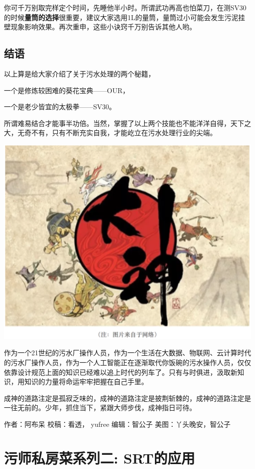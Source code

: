 \documentclass[
]{book}
\begin{document}
你可千万别取完样定个时间，先睡他半小时。所谓武功再高也怕菜刀，在测SV30的时候\textbf{量筒的选择}很重要，建议大家选用1L的量筒，量筒过小可能会发生污泥挂壁现象影响效果。再次重申，这些小诀窍千万别告诉其他人哟。

\hypertarget{ux7ed3ux8bed-6}{%
\subsection{结语}\label{ux7ed3ux8bed-6}}

以上算是给大家介绍了关于污水处理的两个秘籍，

一个是修炼较困难的葵花宝典------OUR，

一个是老少皆宜的太极拳------SV30。

所谓难易结合才能事半功倍。当然，掌握了以上两个技能也不能洋洋自得，天下之大，无奇不有，只有不断充实自我，才能屹立在污水处理行业的尖端。

\includegraphics[width=6.67in]{images/os4}

作为一个21世纪的污水厂操作人员，作为一个生活在大数据、物联网、云计算时代的污水厂操作人员，作为一个人工智能正在逐渐取代你饭碗的污水操作人员，仅仅依靠设计规范上面的知识已经难以追上时代的列车了。只有与时俱进，汲取新知识，用知识的力量将命运牢牢把握在自己手里。

成神的道路注定是孤寂乏味的，成神的道路注定是披荆斩棘的，成神的道路注定是一往无前的。少年，抓住当下，紧跟大师步伐，成神指日可待。

作者：阿布呆
校稿：看透， yufree
编辑：智公子
美图：丫头晚安，智公子

\hypertarget{ux6c61ux5e08ux79c1ux623fux83dcux7cfbux5217ux4e8c-srtux7684ux5e94ux7528}{%
\section{污师私房菜系列二: SRT的应用}\label{ux6c61ux5e08ux79c1ux623fux83dcux7cfbux5217ux4e8c-srtux7684ux5e94ux7528}}
\end{document}

